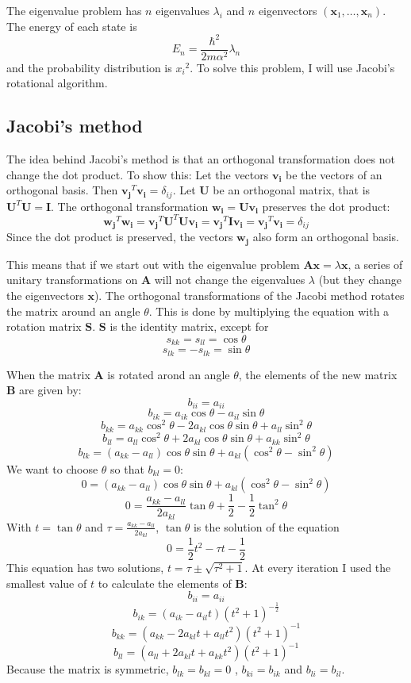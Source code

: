 \documentclass{article}
\begin{document}
The eigenvalue problem has $n$ eigenvalues $\lambda_i$ and $n$ eigenvectors  $({\bm{x}_1},\ldots,\bm{x}_n)$. The energy of each state is 
$$E_n=\frac{{\hbar}^2}{2m{\alpha}^2}{\lambda}_n$$
and the probability distribution is ${x_i}^2$. To solve this problem, I will use Jacobi's rotational algorithm.  

\subsection{Jacobi's method}
The idea behind Jacobi's method is that an orthogonal transformation does not change the dot product. To show this:
Let the vectors $\bm{v_i}$ be the vectors of an orthogonal basis. Then $\bm{v_j}^T\bm{v_i}=\delta_{ij}$. Let $\bm{U}$ be an orthogonal matrix, that is $\bm{U}^T\bm{U}=\bm{I}$. The orthogonal transformation $\bm{w_i}=\bm{Uv_i}$ preserves the dot product:  
$$\bm{w_j}^T\bm{w_i}= \bm{v_j}^T\bm{U}^T\bm{Uv_i}=\bm{v_j}^T\bm{Iv_i}=\bm{v_j}^T\bm{v_i}=\delta_{ij}$$ Since the dot product is preserved, the vectors $\bm{w_j}$ also form an orthogonal basis.

This means that if we start out with the eigenvalue problem $\bm{Ax}=\lambda\bm{x}$, a series of unitary transformations on $\bm{A}$ will not change the eigenvalues $\lambda$ (but they change the eigenvectors $\bm{x}$). The orthogonal transformations of the Jacobi method rotates the matrix around an angle $\theta$. This is done by multiplying the equation with a rotation matrix $\bm{S}$. $\bm{S}$ is the identity matrix, except for 
$$s_{kk}=s_{ll} =\cos \theta$$
$$s_{lk} = -s_{lk} =\sin \theta $$

When the matrix $\bm{A}$ is rotated arond an angle $\theta$, the elements of the new matrix $\bm{B}$ are given by:
$$
b_{ii} = a_{ii} 
$$$$
b_{ik} = a_{ik} \cos{\theta}-a_{il}\sin{\theta} 
$$$$
b_{kk} = a_{kk} \cos^2{\theta}-2a_{kl} \cos{\theta} \sin{\theta}+a_{ll} \sin^2{\theta}
$$$$
b_{ll} = a_{ll}  \cos^2{\theta}+2a_{kl} \cos{\theta} \sin{\theta}+a_{kk} \sin^2{\theta}
$$$$
b_{lk} = (a_{kk}-a_{ll})\cos{\theta} \sin{\theta}+a_{kl}(\cos^2{\theta}-\sin^2{\theta})
$$
We want to choose $\theta$ so that $b_{kl}=0$:
$$
0=(a_{kk}-a_{ll})\cos{\theta} \sin{\theta}+a_{kl}(\cos^2{\theta}-\sin^2{\theta})
$$$$
0=\frac{a_{kk}-a_{ll}}{2a_{kl}}\tan{\theta}+\frac{1}{2}-\frac{1}{2}\tan^2{\theta}
$$
With $t=\tan{\theta}$ and $\tau=\frac{a_{kk}-a_{ll}}{2a_{kl}}$, $\tan{\theta}$ is the solution of the equation $$0=\frac{1}{2}t^2-\tau t-\frac{1}{2}$$  This equation has two solutions, $t=\tau\pm \sqrt{{\tau}^2+1}$. At every iteration I used the smallest value of $t$  to calculate the elements of $\bm{B}$:
$$
b_{ii} = a_{ii} 
$$$$
b_{ik} = (a_{ik}-a_{il}t )(t^2+1)^{-\frac{1}{2}}
$$$$
b_{kk} = (a_{kk}-2a_{kl} t+a_{ll} t^2)(t^2+1)^{-1}
$$$$
b_{ll} = (a_{ll} +2a_{kl} t+a_{kk} t^2)(t^2+1)^{-1}
$$
Because the matrix is symmetric, $b_{lk}=b_{kl}=0$ , $b_{ki}=b_{ik}$ and $b_{li}=b_{il}$.
\end{document}
